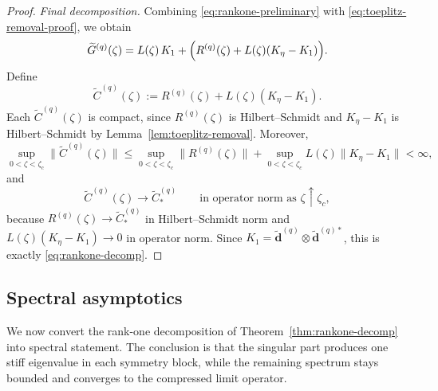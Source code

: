 \documentclass[11pt]{amsart}
\numberwithin{equation}{section}
\theoremstyle{plain}
\theoremstyle{definition}
\theoremstyle{remark}
\begin{document}
\begin{proof}
	\smallskip
	\noindent\emph{Final decomposition.}
	Combining \eqref{eq:rankone-preliminary} with
	\eqref{eq:toeplitz-removal-proof}, we obtain
	\[
		\widetilde G^{(q)}(\zeta)
		=
		L(\zeta)\,K_1
		+
		\Bigl(R^{(q)}(\zeta)+L(\zeta)(K_\eta-K_1)\Bigr).
	\]
	Define
	\[
		\widetilde C^{(q)}(\zeta)
		:=
		R^{(q)}(\zeta)+L(\zeta)(K_\eta-K_1).
	\]
	Each \(\widetilde C^{(q)}(\zeta)\) is compact, since
	\(R^{(q)}(\zeta)\) is Hilbert--Schmidt and \(K_\eta-K_1\) is
	Hilbert--Schmidt by Lemma~\ref{lem:toeplitz-removal}.
	Moreover,
	\[
		\sup_{0<\zeta<\zeta_c}\|\widetilde C^{(q)}(\zeta)\|
		\le
		\sup_{0<\zeta<\zeta_c}\|R^{(q)}(\zeta)\|
		+
		\sup_{0<\zeta<\zeta_c}L(\zeta)\|K_\eta-K_1\|
		<\infty,
	\]
	and
	\[
		\widetilde C^{(q)}(\zeta)\to \widetilde C_*^{(q)}
		\qquad\text{in operator norm as }\zeta\uparrow\zeta_c,
	\]
	because \(R^{(q)}(\zeta)\to \widetilde C_*^{(q)}\) in Hilbert--Schmidt norm
	and \(L(\zeta)(K_\eta-K_1)\to0\) in operator norm. Since \(K_1=\widetilde{\bm d}^{(q)}\otimes \widetilde{\bm d}^{(q)*}\), this
	is exactly \eqref{eq:rankone-decomp}.
\end{proof}


\subsection{Spectral asymptotics}
\label{subsec:spectral-asymptotics}

We now convert the rank-one decomposition of
Theorem~\ref{thm:rankone-decomp} into spectral statement. The conclusion is
that the singular part produces one stiff eigenvalue in each symmetry
block, while the remaining spectrum stays bounded and converges to the
compressed limit operator.
\end{document}
